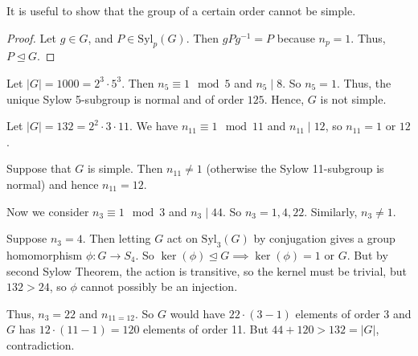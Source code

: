 It is useful to show that the group of a certain order cannot be simple.
\begin{proof}
    Let \(g \in G\), and \(P \in \mathrm{Syl}_p(G)\). Then \(gPg^{-1} = P\) because \(n_p = 1\). Thus, \(P \trianglelefteq G\).
\end{proof}
\begin{example}
    Let \(\left\vert G \right\vert = 1000 = 2^3\cdot 5^3\). Then \(n_5 \equiv 1 \mod 5\) and \(n_5 \mid 8\). So \(n_5 = 1\). Thus, the unique Sylow 5-subgroup is normal and of order \(125\). Hence, \(G\) is not simple.
\end{example}
\begin{example}
    Let \(\left\vert G \right\vert = 132 = 2^2\cdot 3 \cdot 11\). We have \(n_{11}\equiv 1 \mod 11\) and \(n_{11}\mid 12\), so \(n_{11}=1\) or \(12\).

    Suppose that \(G\) is simple. Then \(n_{11} \neq 1\) (otherwise the Sylow 11-subgroup is normal) and hence \(n_{11} = 12\).

    Now we consider \(n_3 \equiv 1 \mod 3\) and \(n_3 \mid 44\). So \(n_3 = 1, 4, 22\). Similarly, \(n_3 \neq 1\).

    Suppose \(n_3 = 4\). Then letting \(G\) act on \(\mathrm{Syl}_{3}(G)\) by conjugation gives a group homomorphism \(\phi: G \to S_4\). So \(\ker (\phi) \trianglelefteq G \implies \ker(\phi)=1\) or \(G\). But by second Sylow Theorem, the action is transitive, so the kernel must be trivial, but \(132 > 24\), so \(\phi\) cannot possibly be an injection.

    Thus, \(n_{3} = 22\) and \(n_{11 = 12}\). So \(G\) would have \(22\cdot(3-1)\) elements of order 3 and \(G\) has \(12 \cdot (11-1) = 120\) elements of order 11. But \(44 + 120 > 132 = \left\vert G \right\vert \), contradiction.
\end{example}
